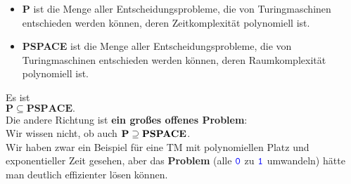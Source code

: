 \begin{frame}
	\begin{Definition}
	\begin{itemize}
		\item \textbf{P} ist die Menge aller Entscheidungsprobleme, die von Turingmaschinen entschieden werden können, deren Zeitkomplexität polynomiell ist.
		\item \textbf{PSPACE} ist die Menge aller Entscheidungsprobleme, die von Turingmaschinen entschieden werden können, deren Raumkomplexität polynomiell ist.
	\end{itemize}
	\end{Definition}
	\pause
	Es ist \\ 
	\mbox{}\hphantom{Wir wissen nicht, ob auch \qquad }$\textbf{P} \subseteq \textbf{PSPACE}.$ \\
	\medskip\pause
	Die andere Richtung ist \textbf{ein großes offenes Problem}:\\
	Wir wissen nicht, ob auch \qquad $\textbf{P} \supseteq \text{\bfseries PSPACE}$. \\
	Wir haben zwar ein Beispiel für eine TM mit polynomiellen Platz und exponentieller Zeit gesehen, aber das \textbf{Problem} (alle $\hbox{\textcolor{blue}{\texttt{0}}}$ zu $\hbox{\textcolor{blue}{\texttt{1}}}$ umwandeln) hätte man deutlich effizienter lösen können.
\end{frame}

